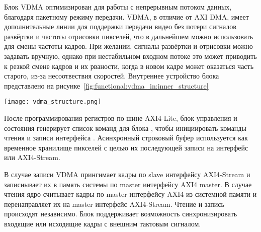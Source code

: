 Блок VDMA оптимизирован для работы с непрерывным потоком данных, благодаря пакетному режиму передачи.
VDMA, в отличие от AXI DMA, имеет дополнительные линии для поддержки передачи видео без потери
сигналов развёртки и частоты отрисовки пикселей, что в дальнейшем можно использовать для смены частоты кадров.
При желании, сигналы развёртки и отрисовки можно задавать вручную, однако при нестабильном входном
потоке это может приводить к резкой смене кадров и их рваности, когда в новом кадре может оказаться
часть старого, из-за несоотвествия скоростей.
Внутреннее устройство блока представлено на рисунке~\ref{fig:functional:vdma_in:inner_structure}

\begin{center}
  \centering
  \texttt{[image: vdma\_structure.png]}
  \label{fig:functional:vdma_in:inner_structure}
\end{center}

После программирования регистров по шине AXI4-Lite, блок управления и состояния генерирует список команд
для блока , чтобы инициировать команды чтения и записи интерфейса .
Асинхронный строковый буфер используется как временное хранилище пикселей с целью их последующей
записи на интерфейс  или AXI4-Stream.

В случае записи VDMA прингимает кадры по slave интерфейсу AXI4-Stream и записиывает
их в память системы по master интерфейсу AXI4 master. В случае чтения ядро считывает
кадры по master интерфейсу AXI4 из системной памяти и перенаправляет их на master интерфейс
AXI4-Stream. Чтение и запись происходят независимо. Блок поддерживает возможность синхронизировать
входящие или исходящие кадры с внешним тактовым сигналом.

